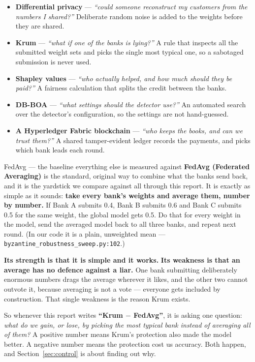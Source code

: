 \documentclass[11pt]{article}
\begin{document}
\begin{itemize}
  \item \textbf{Differential privacy} --- \emph{``could someone reconstruct my customers from the
  numbers I shared?''} Deliberate random noise is added to the weights before they are shared.
  \item \textbf{Krum} --- \emph{``what if one of the banks is lying?''} A rule that inspects all the
  submitted weight sets and picks the single most typical one, so a sabotaged submission is never used.
  \item \textbf{Shapley values} --- \emph{``who actually helped, and how much should they be paid?''}
  A fairness calculation that splits the credit between the banks.
  \item \textbf{DB-BOA} --- \emph{``what settings should the detector use?''} An automated search over
  the detector's configuration, so the settings are not hand-guessed.
  \item \textbf{A Hyperledger Fabric blockchain} --- \emph{``who keeps the books, and can we trust
  them?''} A shared tamper-evident ledger records the payments, and picks which bank leads each round.
\end{itemize}

\begin{keybox}{FedAvg --- the baseline everything else is measured against}
\textbf{FedAvg (Federated Averaging)} is the standard, original way to combine what the banks send back,
and it is the yardstick we compare against all through this report. It is exactly as simple as it
sounds: \textbf{take every bank's weights and average them, number by number.} If Bank A submits 0.4,
Bank B submits 0.6 and Bank C submits 0.5 for the same weight, the global model gets 0.5. Do that for
every weight in the model, send the averaged model back to all three banks, and repeat next round.
(In our code it is a plain, unweighted mean --- \texttt{byzantine\_robustness\_sweep.py:102}.)

\textbf{Its strength is that it is simple and it works.} \textbf{Its weakness is that an average has no
defence against a liar.} One bank submitting deliberately enormous numbers drags the average wherever
it likes, and the other two cannot outvote it, because averaging is not a vote --- everyone gets
included by construction. That single weakness is the reason Krum exists.

So whenever this report writes \textbf{``Krum $-$ FedAvg''}, it is asking one question:
\emph{what do we gain, or lose, by picking the most typical bank instead of averaging all of them?}
A positive number means Krum's protection also made the model better. A negative number means the
protection cost us accuracy. Both happen, and Section~\ref{sec:control} is about finding out why.
\end{keybox}
\end{document}
